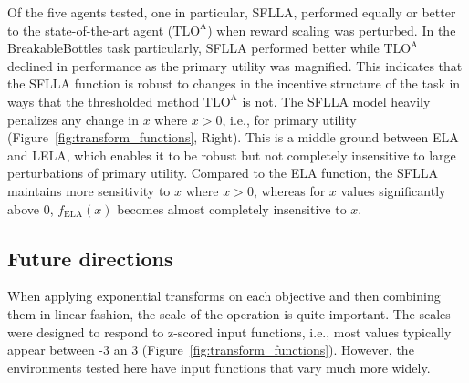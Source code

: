 


Of the five agents tested, one in particular, SFLLA, performed equally or better to the state-of-the-art agent ($\text{TLO}^\text{A}$) when reward scaling was perturbed. In the BreakableBottles task particularly, SFLLA performed better while $\text{TLO}^\text{A}$ declined in performance as the primary utility was magnified. This indicates that the SFLLA function is robust to changes in the incentive structure of the task in ways that the thresholded method $\text{TLO}^\text{A}$ is not. The SFLLA model heavily penalizes any change in $x$ where $x>0$, i.e., for primary utility (Figure~\ref{fig:transform_functions}, Right). This is a middle ground between ELA and LELA, which enables it to be robust but not completely insensitive to large perturbations of primary utility. Compared to the ELA function, the SFLLA maintains more sensitivity to $x$ where $x>0$, whereas for $x$ values significantly above 0, $f_{\text{ELA}}(x)$ becomes almost completely insensitive to $x$. 



\subsection{Future directions}

When applying exponential transforms  on each objective and then combining them in linear fashion, the scale of the operation is quite important. The scales were designed to respond to z-scored input functions, i.e., most values typically appear between -3 an 3 (Figure~\ref{fig:transform_functions}). However, the environments tested here have input functions that vary much more widely.

